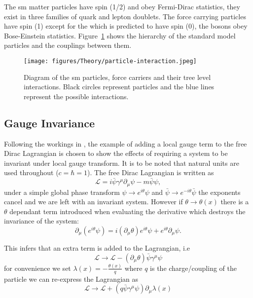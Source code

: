 The \ac{sm} matter particles have spin (1/2) and obey Fermi-Dirac statistics, 
they exist in three families of quark and lepton doublets. The force carrying 
particles have spin (1) except for the \PHiggs which is predicted to have spin 
(0), the bosons obey Bose-Einstein statistics. 
Figure~\ref{fig:figures_Theory_particle-interaction} shows the hierarchy of the 
standard model particles and the couplings between them.

\begin{figure}[htbp]
  \centering
    \texttt{[image: figures/Theory/particle-interaction.jpeg]}
  \caption{Diagram of the \ac{sm} particles, force carriers and their tree 
  level interactions. Black circles represent particles and the blue lines 
  represent the possible interactions.\cite{wikiParticleInteractions}}
  \label{fig:figures_Theory_particle-interaction}
\end{figure}

\subsection{Gauge Invariance} %
\label{sub:gauge_invariance}
Following the workings in \cite{griffiths}, the example of adding a local gauge 
term to the free Dirac Lagrangian is chosen to show the effects of requiring a 
system to be invariant under local gauge transform. It is to be noted that 
natural units are used throughout ($c = \hbar = 1$). The free Dirac Lagrangian 
is written as
\begin{equation}
  \mathcal{L} = i\bar{\psi}\gamma^{\mu}\partial_{\mu}\psi - m\bar{\psi}\psi,
  \label{eq:freeDiracL}
\end{equation}
under a simple global phase transform $\psi\rightarrow e^{i\theta}\psi$ and 
$\bar{\psi}\rightarrow e^{-i\theta}\bar{\psi}$ the exponents cancel and we are 
left with an invariant system. However if $\theta\rightarrow\theta (x)$ there 
is a $\theta$ dependant term introduced when evaluating the derivative which 
destroys the invariance of the system:
\begin{equation}
  \partial_{\mu}\left(e^{i\theta}\psi\right) = i\left(\partial_{\mu}\theta\right)e^{i\theta}\psi + e^{i\theta}\partial_{\mu}\psi.
\end{equation} 

This infers that an extra term is added to the Lagrangian, i.e
\begin{equation}
  \mathcal{L}\rightarrow\mathcal{L}-\left(\partial_{\mu}\theta\right)\bar{\psi}\gamma^{\mu}\psi
\end{equation}
for convenience we set $\lambda(x) = -\frac{\theta(x)}{q}$ where $q$ is the 
charge/coupling of the particle we can re-express the Lagrangian as
\begin{equation}  \mathcal{L} \rightarrow \mathcal{L} + \left( q\bar{\psi}\gamma^{\mu} \psi \right) \partial_{\mu} \lambda(x)
  \label{eq:diracLplusLambda}
\end{equation}

